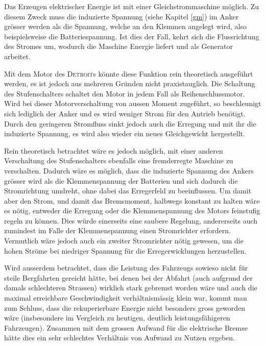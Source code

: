 Das Erzeugen elektrischer Energie ist mit einer Gleichstrommaschine möglich. Zu diesem Zweck muss die induzierte Spannung (siehe Kapitel \ref{gm}) im Anker grösser werden als die Spannung, welche an den Klemmen angelegt wird, also beispielsweise die Batteriespannung. Ist dies der Fall, kehrt sich die Flussrichtung des Stromes um, wodurch die Maschine Energie liefert und als Generator arbeitet.

Mit dem Motor des \textsc{Detroit}s könnte diese Funktion rein theoretisch ausgeführt werden, es ist jedoch aus mehreren Gründen nicht praxistauglich. Die Schaltung des Stufenschalters schaltet den Motor in jedem Fall als Reihenschlussmotor. Wird bei dieser Motorverschaltung von aussen Moment zugeführt, so beschleunigt sich lediglich der Anker und es wird weniger Strom für den Antrieb benötigt. Durch den geringeren Stromfluss sinkt jedoch auch die Erregung und mit ihr die induzierte Spannung, es wird also wieder ein neues Gleichgewicht hergestellt.

Rein theoretisch betrachtet wäre es jedoch möglich, mit einer anderen Verschaltung des Stufenschalters ebenfalls eine fremderregte Maschine zu verschalten. Dadurch wäre es möglich, dass die induzierte Spannung des Ankers grösser wird als die Klemmenspannung der Batterien und sich dadurch die Stromrichtung umdreht, ohne dabei das Erregerfeld zu beeinflussen. Um damit aber den Strom, und damit das Bremsmoment, halbwegs konstant zu halten wäre es nötig, entweder die Erregung oder die Klemmenspannung des Motors feinstufig regeln zu können. Dies würde einerseits eine saubere Regelung, andererseits auch zumindest im Falle der Klemmenspannung einen Stromrichter erfordern. Vermutlich wäre jedoch auch ein zweiter Stromrichter nötig gewesen, um die hohen Ströme bei niedriger Spannung für die Erregerwicklungen herzustellen.

Wird ausserdem betrachtet, dass die Leistung des Fahrzeugs sowieso nicht für steile Bergfahrten gereicht hätte, bei denen bei der Abfahrt (auch aufgrund der damals schlechteren Strassen) wirklich stark gebremst worden wäre und auch die maximal erreichbare Geschwindigkeit verhältnismässig klein war, kommt man zum Schluss, dass die rekuperierbare Energie nicht besonders gross geworden wäre (insbesondere im Vergleich zu heutigen, deutlich leistungsfähigeren Fahrzeugen). Zusammen mit dem grossen Aufwand für die elektrische Bremse hätte dies ein sehr schlechtes Verhältnis von Aufwand zu Nutzen ergeben.